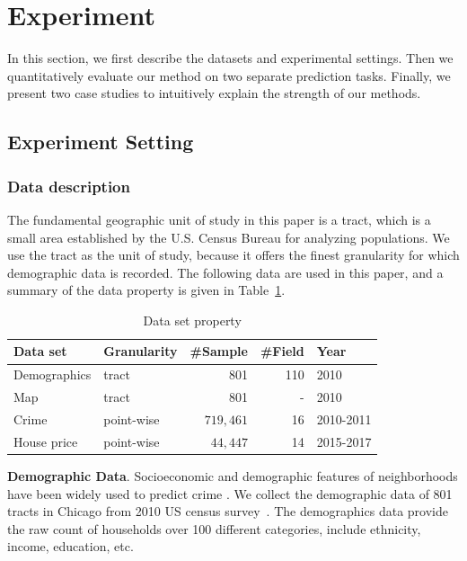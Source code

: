 \section{Experiment}
\label{sec:experiment}

In this section, we first describe the datasets and experimental settings. Then we quantitatively evaluate our method on two separate prediction tasks. Finally, we present two case studies to intuitively explain the strength of our methods. 


\subsection{Experiment Setting}  \label{data:sets}

\subsubsection{Data description}
The fundamental geographic unit of study in this paper is a tract, which is a small area established by the U.S. Census Bureau for analyzing populations. We use the tract as the unit of study, because it offers the finest granularity for which demographic data is recorded. The following data are used in this paper, and a summary of the data property is given in Table~\ref{tab:data-summary}.

\begin{table}
\centering
\caption{Data set property}
\label{tab:data-summary}
\begin{tabular}{|l|l|r|r|l|}
\hline
Data set & Granularity & \#Sample & \#Field & Year \\ \hline
Demographics & tract & 801 & 110 & 2010 \\ \hline
Map & tract & 801 & - & 2010 \\ \hline
Crime & point-wise & $719,461$ & 16 & 2010-2011 \\ \hline
House price & point-wise & $44,447$ & 14 & 2015-2017 \\ \hline
\end{tabular}
\end{table}

\textbf{Demographic Data}. Socioeconomic and demographic features of neighborhoods have been widely used to predict crime \cite{wang2016simple}. We collect the demographic data of 801 tracts in Chicago from 2010 US census survey~\cite{census:2010}. The demographics data provide the raw count of households over 100 different categories, include ethnicity, income, education, etc.

